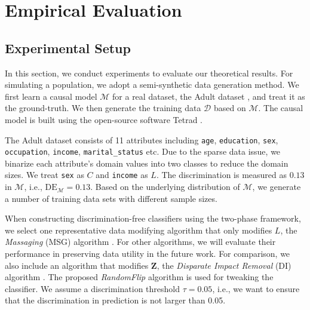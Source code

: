 \documentclass{article}
\begin{document}
\section{Empirical Evaluation}

\subsection{Experimental Setup}
In this section, we conduct experiments to evaluate our theoretical results. For simulating a population, we adopt a semi-synthetic data generation method. We first learn a causal model $\mathcal{M}$ for a real dataset, the Adult dataset \cite{adultdataset}, and treat it as the ground-truth. We then generate the training data $\mathcal{D}$ based on $\mathcal{M}$. The causal model is built using the open-source software Tetrad \cite{tetrad}. %

The Adult dataset consists of 11 attributes including \texttt{age}, \texttt{education}, \texttt{sex}, \texttt{occupation}, \texttt{income}, \texttt{marital\_status} etc. Due to the sparse data issue, we binarize each attribute's domain values into two classes to reduce the domain sizes. 
We treat \texttt{sex} as $C$ and \texttt{income} as $L$. 
The discrimination is measured as $0.13$ in $\mathcal{M}$, i.e., $\mathrm{DE}_{\mathcal{M}} = 0.13$.
Based on the underlying distribution of $\mathcal{M}$, we generate a number of training data sets with different sample sizes. 

When constructing discrimination-free classifiers using the two-phase framework, we select one representative data modifying algorithm that only modifies $L$, the \emph{Massaging} (MSG) algorithm \cite{kamiran2009classifying}. For other algorithms, we will evaluate their performance in preserving data utility in the future work.
For comparison, we also include an algorithm that modifies $\mathbf{Z}$, the \emph{Disparate Impact Removal} (DI) algorithm \cite{adler2016auditing}.
The proposed \emph{RandomFlip} algorithm is used for tweaking the classifier. We assume a discrimination threshold $\tau = 0.05$, i.e., we want to ensure that the discrimination in prediction is not larger than 0.05.
\end{document}
